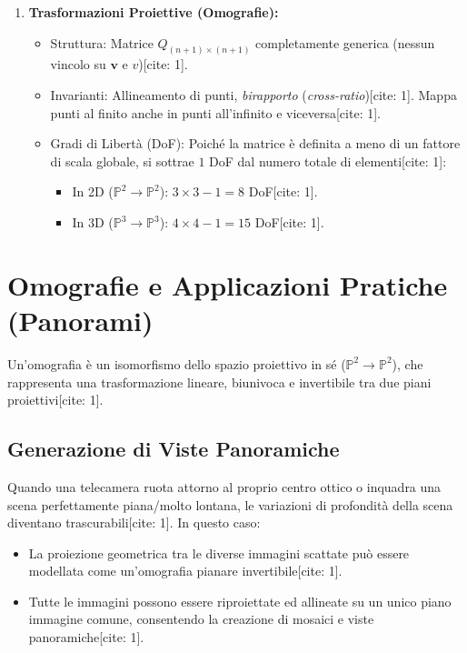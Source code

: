 \begin{enumerate}
    \item \textbf{Trasformazioni Proiettive (Omografie):}
    \begin{itemize}
        \item Struttura: Matrice $Q_{(n+1) \times (n+1)}$ completamente generica (nessun vincolo su $\mathbf{v}$ e $v$)[cite: 1].
        \item Invarianti: Allineamento di punti, \emph{birapporto} (\emph{cross-ratio})[cite: 1]. Mappa punti al finito anche in punti all'infinito e viceversa[cite: 1].
        \item Gradi di Libertà (DoF): Poiché la matrice è definita a meno di un fattore di scala globale, si sottrae $1$ DoF dal numero totale di elementi[cite: 1]:
        \begin{itemize}
            \item In 2D ($\mathbb{P}^2 \to \mathbb{P}^2$): $3 \times 3 - 1 = 8$ DoF[cite: 1].
            \item In 3D ($\mathbb{P}^3 \to \mathbb{P}^3$): $4 \times 4 - 1 = 15$ DoF[cite: 1].
        \end{itemize}
    \end{itemize}
\end{enumerate}

\section{Omografie e Applicazioni Pratiche (Panorami)}
Un'omografia è un isomorfismo dello spazio proiettivo in sé ($\mathbb{P}^2 \to \mathbb{P}^2$), che rappresenta una trasformazione lineare, biunivoca e invertibile tra due piani proiettivi[cite: 1].

\subsection{Generazione di Viste Panoramiche}
Quando una telecamera ruota attorno al proprio centro ottico o inquadra una scena perfettamente piana/molto lontana, le variazioni di profondità della scena diventano trascurabili[cite: 1]. In questo caso:
\begin{itemize}
    \item La proiezione geometrica tra le diverse immagini scattate può essere modellata come un'omografia pianare invertibile[cite: 1].
    \item Tutte le immagini possono essere riproiettate ed allineate su un unico piano immagine comune, consentendo la creazione di mosaici e viste panoramiche[cite: 1].
\end{itemize}

